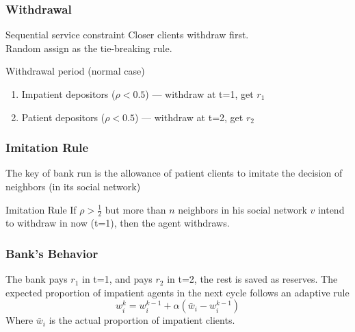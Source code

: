 \begin{frame}
    \frametitle{Withdrawal}

    \pause
    \begin{block}{Sequential service constraint}
        Closer clients withdraw first. \\ 
        Random assign as the tie-breaking rule.
    \end{block}
    \pause
    \vfill
    Withdrawal period (normal case)
    \begin{enumerate}
        \item Impatient depositors ($\rho < 0.5$) --- withdraw at t=1, get $r_1$
        \item Patient depositors ($\rho < 0.5$) --- withdraw at t=2, get $r_2$
    \end{enumerate}

\end{frame}

\begin{frame}
    \frametitle{Imitation Rule}
    The key of bank run is the allowance of patient clients to imitate the decision of neighbors (in its social network)

    \begin{block}{Imitation Rule}
        If $\rho>\frac{1}{2}$ but more than $n$ neighbors in his social network $v$ intend to withdraw in now (t=1), then the agent withdraws.
    \end{block}

\end{frame}

\begin{frame}
    \frametitle{Bank's Behavior}
    The bank pays $r_1$ in t=1, and pays $r_2$ in t=2, the rest is saved as reserves.
    \vfill
    The expected proportion of impatient agents in the next cycle follows an adaptive rule 
    \begin{equation*}
        w^k_i = w^{k-1}_i + \alpha (\bar{w}_i - w^{k-1}_i)
    \end{equation*}
    Where $\bar{w}_i$ is the actual proportion of impatient clients.
    
\end{frame}


